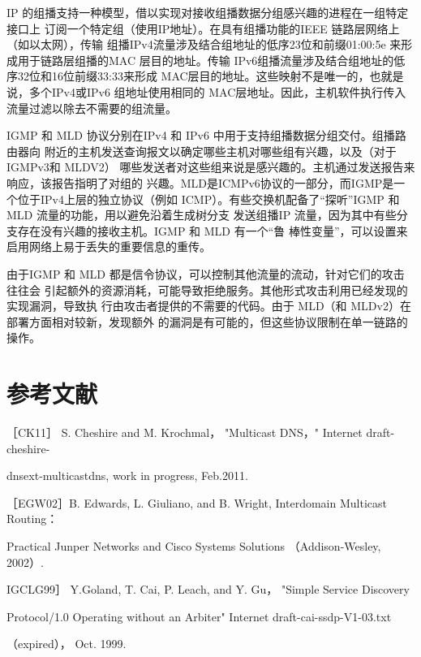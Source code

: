 IP 的组播支持一种模型，借以实现对接收组播数据分组感兴趣的进程在一组特定接口上
订阅一个特定组（使用IP地址）。在具有组播功能的IEEE 链路层网络上（如以太网），传输
组播IPv4流量涉及结合组地址的低序23位和前缀01:00:5e 来形成用于链路层组播的MAC
层目的地址。传输 IPv6组播流量涉及结合组地址的低序32位和16位前缀33:33来形成
MAC层目的地址。这些映射不是唯一的，也就是说，多个IPv4或IPv6 组地址使用相同的
MAC层地址。因此，主机软件执行传入流量过滤以除去不需要的组流量。

IGMP 和 MLD 协议分别在IPv4 和 IPv6 中用于支持组播数据分组交付。组播路由器向
附近的主机发送查询报文以确定哪些主机对哪些组有兴趣，以及（对于 IGMPv3和 MLDV2）
哪些发送者对这些组来说是感兴趣的。主机通过发送报告来响应，该报告指明了对组的
兴趣。MLD是ICMPv6协议的一部分，而IGMP是一个位于IPv4上层的独立协议（例如
ICMP）。有些交换机配备了“探听”IGMP 和 MLD 流量的功能，用以避免沿着生成树分支
发送组播IP 流量，因为其中有些分支存在没有兴趣的接收主机。IGMP 和 MLD 有一个“鲁
棒性变量”，可以设置来启用网络上易于丢失的重要信息的重传。

由于IGMP 和 MLD 都是信令协议，可以控制其他流量的流动，针对它们的攻击往往会
引起额外的资源消耗，可能导致拒绝服务。其他形式攻击利用已经发现的实现漏洞，导致执
行由攻击者提供的不需要的代码。由于 MLD（和 MLDv2）在部署方面相对较新，发现额外
的漏洞是有可能的，但这些协议限制在单一链路的操作。

\section{参考文献}
［CK11］ S. Cheshire and M. Krochmal， "Multicast DNS，" Internet draft-cheshire-

dnsext-multicastdns, work in progress, Feb.2011.

［EGW02］B. Edwards, L. Giuliano, and B. Wright, Interdomain Multicast Routing：

Practical Junper Networks and Cisco Systems Solutions （Addison-Wesley, 2002）.

IGCLG99］ Y.Goland, T. Cai, P. Leach, and Y. Gu， "Simple Service Discovery

Protocol/1.0 Operating without an Arbiter" Internet draft-cai-ssdp-V1-03.txt

（expired）， Oct. 1999.
